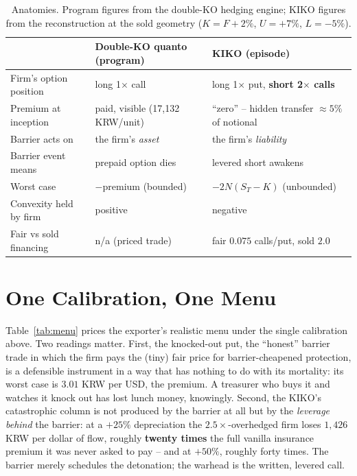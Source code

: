 \documentclass[11pt,a4paper]{article}
\begin{document}
\begin{table}[h]
\centering
\small
\begin{tabular}{p{}p{}p{}}
\toprule
 & Double-KO quanto (program) & KIKO (episode) \\
\midrule
Firm's option position & long 1$\times$ call & long 1$\times$ put, \textbf{short 2$\times$ calls} \\
Premium at inception & paid, visible (17{,}132 KRW/unit) & ``zero'' -- hidden transfer $\approx5\%$ of notional \\
Barrier acts on & the firm's \emph{asset} & the firm's \emph{liability} \\
Barrier event means & prepaid option dies & levered short awakens \\
Worst case & $-$premium (bounded) & $-2N(S_T-K)$ (unbounded) \\
Convexity held by firm & positive & negative \\
Fair vs sold financing & n/a (priced trade) & fair $0.075$ calls/put, sold $2.0$ \\
\bottomrule
\end{tabular}
\caption{Anatomies. Program figures from the double-KO hedging engine; KIKO figures from the reconstruction at the sold geometry ($K=F+2\%$, $U=+7\%$, $L=-5\%$).}
\label{tab:anatomy}
\end{table}

\section{One Calibration, One Menu}
\label{sec:ledger}

Table~\ref{tab:menu} prices the exporter's realistic menu under the single calibration above. Two readings matter. First, the knocked-out put, the ``honest'' barrier trade in which the firm pays the (tiny) fair price for barrier-cheapened protection, is a defensible instrument in a way that has nothing to do with its mortality: its worst case is $3.01$ KRW per USD, the premium. A treasurer who buys it and watches it knock out has lost lunch money, knowingly. Second, the KIKO's catastrophic column is not produced by the barrier at all but by the \emph{leverage behind} the barrier: at a $+25\%$ depreciation the $2.5\times$-overhedged firm loses $1{,}426$ KRW per dollar of flow, roughly \textbf{twenty times} the full vanilla insurance premium it was never asked to pay -- and at $+50\%$, roughly forty times. The barrier merely schedules the detonation; the warhead is the written, levered call.
\end{document}
